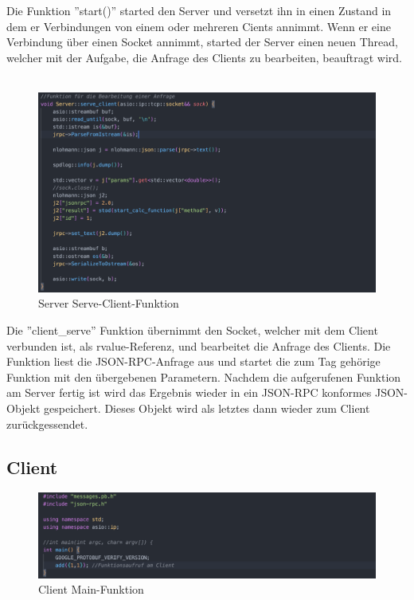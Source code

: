 \documentclass[german,oneside,color]{htldipl}
\begin{document}
Die Funktion ''start()'' started den Server und versetzt ihn in einen Zustand in dem er Verbindungen von einem oder mehreren Cients annimmt. Wenn er eine Verbindung über einen Socket annimmt, started der Server einen neuen Thread, welcher mit der Aufgabe, die Anfrage des Clients zu bearbeiten, beauftragt wird. 
\\
\\
\newpage
\begin{figure}[h!]
  \centering
  \includegraphics[width=1\textwidth]{images/Server_serve.png}
  \caption{Server Serve-Client-Funktion}
  \label{Server_serve}
\end{figure}    
Die ''client\_serve'' Funktion übernimmt den Socket, welcher mit dem Client verbunden ist, als rvalue-Referenz, und bearbeitet die Anfrage des Clients. Die Funktion liest die JSON-RPC-Anfrage aus und startet die zum Tag gehörige Funktion mit den übergebenen Parametern. Nachdem die aufgerufenen Funktion am Server fertig ist wird das Ergebnis wieder in ein JSON-RPC konformes JSON-Objekt gespeichert. Dieses Objekt wird als letztes dann wieder zum Client zurückgessendet.

\subsection{Client}
\begin{figure}[h!]
  \centering
  \includegraphics[width=1\textwidth]{images/Client_main.png}
  \caption{Client Main-Funktion}
  \label{Client_main}
\end{figure}    
\end{document}
